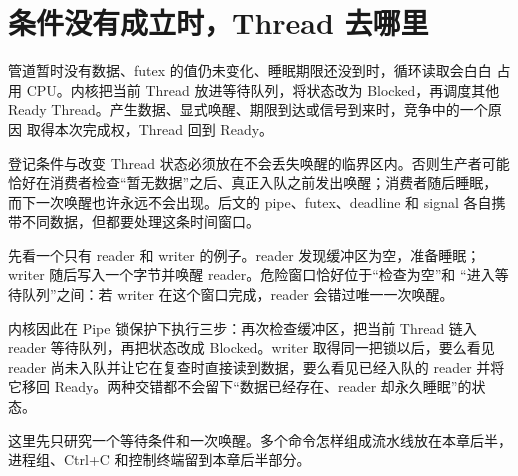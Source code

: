 \section{条件没有成立时，Thread 去哪里}

管道暂时没有数据、futex 的值仍未变化、睡眠期限还没到时，循环读取会白白
占用 CPU。内核把当前 Thread 放进等待队列，将状态改为 Blocked，再调度其他
Ready Thread。产生数据、显式唤醒、期限到达或信号到来时，竞争中的一个原因
取得本次完成权，Thread 回到 Ready。

\begin{center}
\end{center}

登记条件与改变 Thread 状态必须放在不会丢失唤醒的临界区内。否则生产者可能
恰好在消费者检查“暂无数据”之后、真正入队之前发出唤醒；消费者随后睡眠，
而下一次唤醒也许永远不会出现。后文的 pipe、futex、deadline 和 signal
各自携带不同数据，但都要处理这条时间窗口。

先看一个只有 reader 和 writer 的例子。reader 发现缓冲区为空，准备睡眠；
writer 随后写入一个字节并唤醒 reader。危险窗口恰好位于“检查为空”和
“进入等待队列”之间：若 writer 在这个窗口完成，reader 会错过唯一一次唤醒。

内核因此在 Pipe 锁保护下执行三步：再次检查缓冲区，把当前 Thread 链入
reader 等待队列，再把状态改成 Blocked。writer 取得同一把锁以后，要么看见
reader 尚未入队并让它在复查时直接读到数据，要么看见已经入队的 reader 并将
它移回 Ready。两种交错都不会留下“数据已经存在、reader 却永久睡眠”的状态。

这里先只研究一个等待条件和一次唤醒。多个命令怎样组成流水线放在本章后半，
进程组、Ctrl+C 和控制终端留到本章后半部分。
